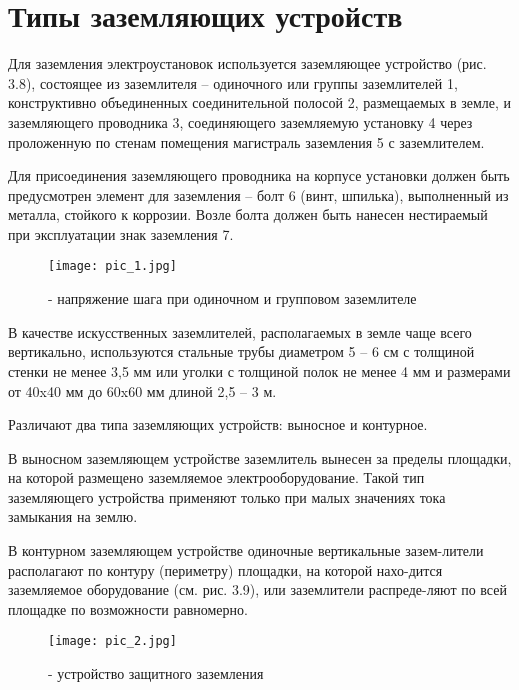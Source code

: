 







\section{Типы заземляющих устройств}
Для заземления электроустановок используется заземляющее устройство (рис. 3.8), состоящее из заземлителя – одиночного или группы заземлителей 1, конструктивно объединенных соединительной полосой 2, размещаемых в земле, и заземляющего проводника 3, соединяющего заземляемую установку 4 через проложенную по стенам помещения магистраль заземления 5 с заземлителем.

Для присоединения заземляющего проводника на корпусе установки должен быть предусмотрен элемент для заземления – болт 6 (винт, шпилька), выполненный из металла, стойкого к коррозии. Возле болта должен быть нанесен нестираемый при эксплуатации знак заземления 7.


\begin{figure}[H]
	\begin{center}
		\texttt{[image: pic\_1.jpg]}
		\caption{ - напряжение шага при одиночном и групповом заземлителе} 
		\label{pic:pic_1} %
	\end{center}
\end{figure}

В качестве искусственных заземлителей, располагаемых в земле чаще всего вертикально, используются стальные трубы диаметром 5 – 6 см с толщиной стенки не менее 3,5 мм или уголки с толщиной полок не менее 4 мм и размерами от 40x40 мм до 60x60 мм длиной 2,5 – 3 м.

Различают два типа заземляющих устройств: выносное и контурное.

В выносном заземляющем устройстве заземлитель вынесен за пределы площадки, на которой размещено заземляемое электрооборудование. Такой тип заземляющего устройства применяют только при малых значениях тока замыкания на землю.

В контурном заземляющем устройстве одиночные вертикальные зазем-лители располагают по контуру (периметру) площадки, на которой нахо-дится заземляемое оборудование (см. рис. 3.9), или заземлители распреде-ляют по всей площадке по возможности равномерно.

\begin{figure}[H]
	\begin{center}
		\texttt{[image: pic\_2.jpg]}
		\caption{ - устройство защитного заземления} 
		\label{pic:pic_1} %
	\end{center}
\end{figure}

